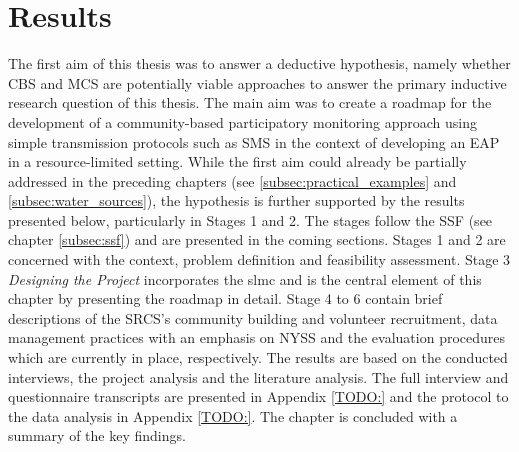
\chapter{Results} %

\label{chapter4}



The first aim of this thesis was to answer a deductive hypothesis, namely whether CBS and MCS are potentially viable approaches to answer the primary inductive research question of this thesis. The main aim was to create a roadmap for the development of a community-based participatory monitoring approach using simple transmission protocols such as SMS in the context of developing an EAP in a resource-limited setting. While the first aim could already be partially addressed in the preceding chapters (see \ref*{subsec:practical_examples} and \ref*{subsec:water_sources}), the hypothesis is further supported by the results presented below, particularly in Stages 1 and 2.
The stages follow the SSF (see chapter \ref*{subsec:ssf}) and are presented in the coming sections. Stages 1 and 2 are concerned with the context, problem definition and feasibility assessment. Stage 3 \textit{Designing the Project} incorporates the \acrshort*{slmc} and is the central element of this chapter by presenting the roadmap in detail. Stage 4 to 6 contain brief descriptions of the SRCS's community building and volunteer recruitment, data management practices with an emphasis on NYSS and the evaluation procedures which are currently in place, respectively. The results are based on the conducted interviews, the project analysis and the literature analysis. The full interview and questionnaire transcripts are presented in Appendix \ref*{TODO:} and the protocol to the data analysis in Appendix \ref*{TODO:}. The chapter is concluded with a summary of the key findings.

